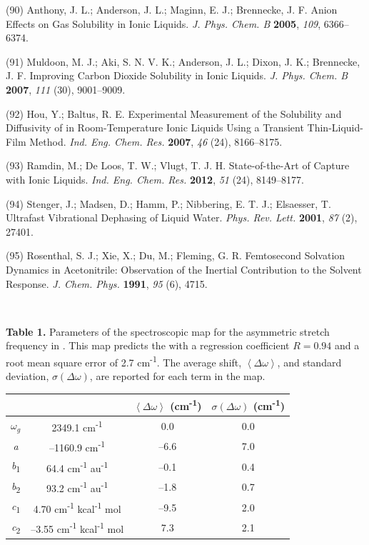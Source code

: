 \documentclass[]{article}
\begin{document}
(90) Anthony, J. L.; Anderson, J. L.; Maginn, E. J.; Brennecke, J. F.
Anion Effects on Gas Solubility in Ionic Liquids. \emph{J. Phys. Chem.
B} \textbf{2005}, \emph{109}, 6366--6374.

(91) Muldoon, M. J.; Aki, S. N. V. K.; Anderson, J. L.; Dixon, J. K.;
Brennecke, J. F. Improving Carbon Dioxide Solubility in Ionic Liquids.
\emph{J. Phys. Chem. B} \textbf{2007}, \emph{111} (30), 9001--9009.

(92) Hou, Y.; Baltus, R. E. Experimental Measurement of the Solubility
and Diffusivity of  in Room-Temperature Ionic Liquids
Using a Transient Thin-Liquid-Film Method. \emph{Ind. Eng. Chem. Res.}
\textbf{2007}, \emph{46} (24), 8166--8175.

(93) Ramdin, M.; De Loos, T. W.; Vlugt, T. J. H. State-of-the-Art of
 Capture with Ionic Liquids. \emph{Ind. Eng. Chem.
Res.} \textbf{2012}, \emph{51} (24), 8149--8177.

(94) Stenger, J.; Madsen, D.; Hamm, P.; Nibbering, E. T. J.; Elsaesser,
T. Ultrafast Vibrational Dephasing of Liquid Water. \emph{Phys. Rev.
Lett.} \textbf{2001}, \emph{87} (2), 27401.

(95) Rosenthal, S. J.; Xie, X.; Du, M.; Fleming, G. R. Femtosecond
Solvation Dynamics in Acetonitrile: Observation of the Inertial
Contribution to the Solvent Response. \emph{J. Chem. Phys.}
\textbf{1991}, \emph{95} (6), 4715.

\textbf{\\
}

\textbf{Table 1.} Parameters of the spectroscopic map for the  asymmetric stretch frequency in \ce{[C4C1im][PF6]}.  This map predicts the  with a regression coefficient \(R = 0.94\) and a root mean square error of 2.7 cm\textsuperscript{-1}. The average shift, \(\left\langle \Delta\omega \right\rangle\), and standard deviation, \(\sigma(\Delta\omega)\), are reported for each term in the map.

\begin{longtable}[]{@{}cccc@{}}
\toprule
& & \(\left\langle \Delta\omega \right\rangle\) (cm\textsuperscript{-1}) &
\(\sigma(\Delta\omega)\) (cm\textsuperscript{-1})\tabularnewline
\midrule
\endhead
\(\omega_{g}\) & 2349.1 cm\textsuperscript{-1} & 0.0 &
0.0\tabularnewline
\emph{a} & --1160.9 cm\textsuperscript{-1} & --6.6 & 7.0\tabularnewline
\emph{b}\textsubscript{1} & 64.4 cm\textsuperscript{-1}
au\textsuperscript{-1} & --0.1 & 0.4\tabularnewline
\emph{b}\textsubscript{2} & 93.2 cm\textsuperscript{-1}
au\textsuperscript{-1} & --1.8 & 0.7\tabularnewline
\emph{c}\textsubscript{1} & 4.70 cm\textsuperscript{-1}
kcal\textsuperscript{-1} mol & --9.5 & 2.0\tabularnewline
\emph{c}\textsubscript{2} & --3.55 cm\textsuperscript{-1}
kcal\textsuperscript{-1} mol & 7.3 & 2.1\tabularnewline
\bottomrule
\end{longtable}
\end{document}
